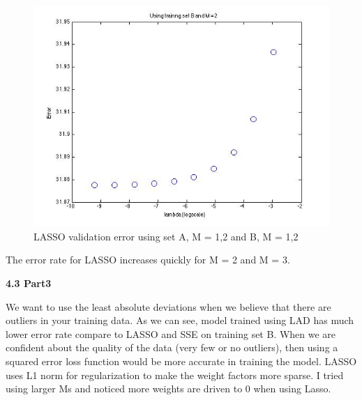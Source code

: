 \begin{figure}[!htb]
\endminipage\hfill
{}
  \includegraphics[width=\linewidth]{figures/p4_LASSO_regressB_m=2}
\endminipage\hfill
\caption{LASSO validation error using set A, M = 1,2 and B, M = 1,2}\label{fig:p4_LASSO}
\end{figure}


The error rate for LASSO increases quickly for M = 2 and M = 3.

{\bfseries 4.3 Part3}

We want to use the least absolute deviations
when we believe that there are outliers in your training data. As we can see, model trained using LAD
has much lower error rate compare to LASSO and SSE on training set B. When we are confident about the quality of the data (very few or no outliers), then using a squared error loss function would be more accurate in training the model. LASSO uses L1 norm for regularization to make the weight factors more sparse. 
I tried using larger Ms and noticed more weights are driven to 0 when using Lasso. 
